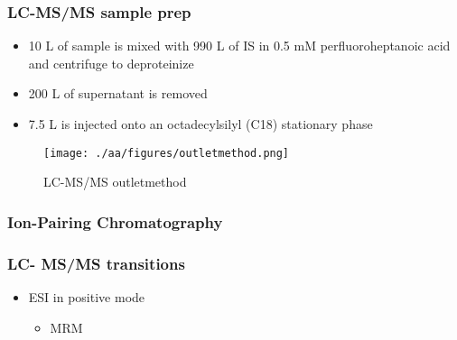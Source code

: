\documentclass[12pt]{scrartcl}
\begin{document}
\subsubsection{LC-MS/MS sample prep}
\label{sec:org29c709f}
\begin{itemize}
\item 10 \textmu{}L of sample is mixed with 990 \textmu{}L of IS in 0.5 mM perfluoroheptanoic acid and centrifuge to deproteinize
\item 200 \textmu{}L of supernatant is removed
\item 7.5 \textmu{}L is injected onto an octadecylsilyl (C18) stationary phase
\end{itemize}


\begin{figure}[htbp]
\centering
\texttt{[image: ./aa/figures/outletmethod.png]}
\caption{\label{fig:orgb533a69}LC-MS/MS outletmethod}
\end{figure}

\subsubsection{Ion-Pairing Chromatography}
\label{sec:orgd439bff}

\chemnameinit{}


\subsubsection{LC- MS/MS transitions}
\label{sec:org7f51efb}
\begin{itemize}
\item ESI in positive mode
\begin{itemize}
\item MRM
\end{itemize}
\end{itemize}
\end{document}
